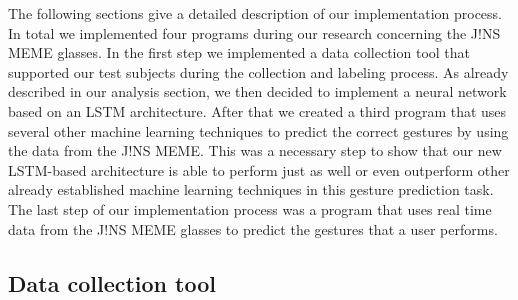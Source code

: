 \documentclass[runningheads]{llncs}
\begin{document}
The following sections give a detailed description of our implementation process. In total we implemented four programs during our research concerning the J!NS MEME glasses. In the first step we implemented a data collection tool that supported our test subjects during the collection and labeling process. As already described in our analysis section, we then decided to implement a neural network based on an LSTM architecture. After that we created a third program that uses several other machine learning techniques to predict the correct gestures by using the data from the J!NS MEME. This was a necessary step to show that our new LSTM-based architecture is able to perform just as well or even outperform other already established machine learning techniques in this gesture prediction task. The last step of our implementation process was a program that uses real time data from the J!NS MEME glasses to predict the gestures that a user performs.

\subsection{Data collection tool}
\end{document}
